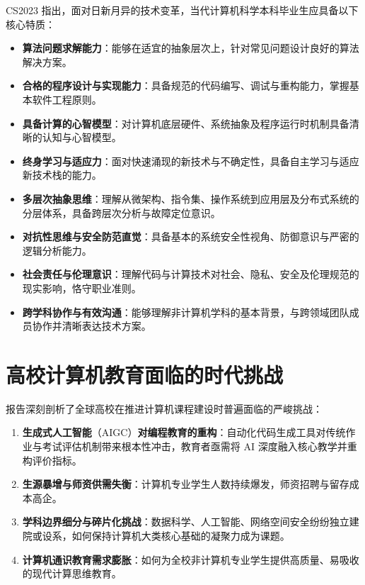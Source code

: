 CS2023 指出，面对日新月异的技术变革，当代计算机科学本科毕业生应具备以下核心特质：
\begin{itemize}
    \item \textbf{算法问题求解能力}：能够在适宜的抽象层次上，针对常见问题设计良好的算法解决方案。
    \item \textbf{合格的程序设计与实现能力}：具备规范的代码编写、调试与重构能力，掌握基本软件工程原则。
    \item \textbf{具备计算的心智模型}：对计算机底层硬件、系统抽象及程序运行时机制具备清晰的认知与心智模型。
    \item \textbf{终身学习与适应力}：面对快速涌现的新技术与不确定性，具备自主学习与适应新技术栈的能力。
    \item \textbf{多层次抽象思维}：理解从微架构、指令集、操作系统到应用层及分布式系统的分层体系，具备跨层次分析与故障定位意识。
    \item \textbf{对抗性思维与安全防范直觉}：具备基本的系统安全性视角、防御意识与严密的逻辑分析能力。
    \item \textbf{社会责任与伦理意识}：理解代码与计算技术对社会、隐私、安全及伦理规范的现实影响，恪守职业准则。
    \item \textbf{跨学科协作与有效沟通}：能够理解非计算机学科的基本背景，与跨领域团队成员协作并清晰表达技术方案。
\end{itemize}

\section{高校计算机教育面临的时代挑战}

报告深刻剖析了全球高校在推进计算机课程建设时普遍面临的严峻挑战：
\begin{enumerate}
    \item \textbf{生成式人工智能}（AIGC）\textbf{对编程教育的重构}：自动化代码生成工具对传统作业与考试评估机制带来根本性冲击，教育者亟需将 AI 深度融入核心教学并重构评价指标。
    \item \textbf{生源暴增与师资供需失衡}：计算机专业学生人数持续爆发，师资招聘与留存成本高企。
    \item \textbf{学科边界细分与碎片化挑战}：数据科学、人工智能、网络空间安全纷纷独立建院或设系，如何保持计算机大类核心基础的凝聚力成为课题。
    \item \textbf{计算机通识教育需求膨胀}：如何为全校非计算机专业学生提供高质量、易吸收的现代计算思维教育。
\end{enumerate}

